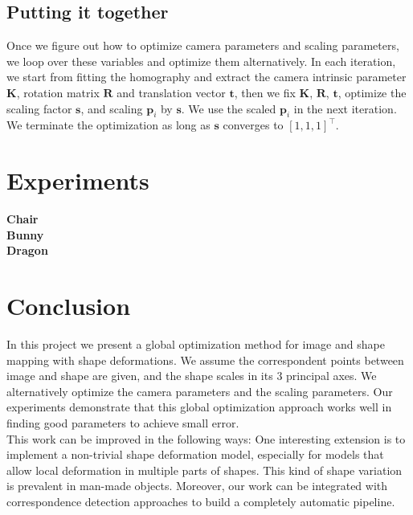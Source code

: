\documentclass[10pt,twocolumn,letterpaper]{article}
\begin{document}
\subsection{Putting it together}

\noindent
Once we figure out how to optimize camera parameters and scaling parameters, we loop over these variables and optimize them alternatively. In each iteration, we start from fitting the homography and extract the camera intrinsic parameter $\mathbf{K}$, rotation matrix $\mathbf{R}$ and translation vector $\mathbf{t}$, then we fix $\mathbf{K}$, $\mathbf{R}$, $\mathbf{t}$, optimize the scaling factor $\mathbf{s}$, and scaling $\mathbf{p}_i$ by $\mathbf{s}$. We use the scaled $\mathbf{p}_i$ in the next iteration. We terminate the optimization as long as $\mathbf{s}$ converges to $[1,1,1]^\top$.

\section{Experiments}

\noindent
\textbf{Chair} \\

\noindent
\textbf{Bunny} \\

\noindent
\textbf{Dragon}

\section{Conclusion}

\noindent
In this project we present a global optimization method for image and shape mapping with shape deformations. We assume the correspondent points between image and shape are given, and the shape scales in its 3 principal axes. We alternatively optimize the camera parameters and the scaling parameters. Our experiments demonstrate that this global optimization approach works well in finding good parameters to achieve small error.\\

\noindent
This work can be improved in the following ways: One interesting extension is to implement a non-trivial shape deformation model, especially for models that allow local deformation in multiple parts of shapes. This kind of shape variation is prevalent in man-made objects. Moreover, our work can be integrated with correspondence detection approaches to build a completely automatic pipeline.

{\small


}
\end{document}
